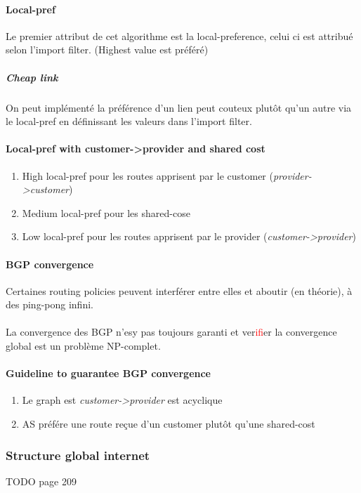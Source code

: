 \paragraph{Local-pref}
Le premier attribut de cet algorithme est la local-preference, celui ci est attribué
selon l'import filter. (Highest value est préféré)

\subparagraph{Cheap link} On peut implémenté la préférence d'un lien peut couteux
plutôt qu'un autre via le local-pref en définissant les valeurs dans l'import filter.


\paragraph{Local-pref with customer->provider and shared cost}
\begin{enumerate}
    \item High local-pref pour les routes apprisent par le customer (\textit{provider->customer})
    \item Medium local-pref pour les shared-cose
    \item Low local-pref pour les routes apprisent par le provider (\textit{customer->provider})
\end{enumerate}


\paragraph{BGP convergence}
Certaines routing policies peuvent interférer entre elles et aboutir (en théorie),
à des ping-pong infini.

\paragraph{ } La convergence des BGP n'esy pas toujours garanti et ver\textcolor{red}{if}ier la
convergence global est un problème NP-complet.

\paragraph{Guideline to guarantee BGP convergence}
\begin{enumerate}
    \item Le graph est \textit{customer->provider} est acyclique
    \item AS préfére une route reçue d'un customer plutôt qu'une shared-cost
\end{enumerate}

\subsubsection{Structure global internet}
TODO page 209

